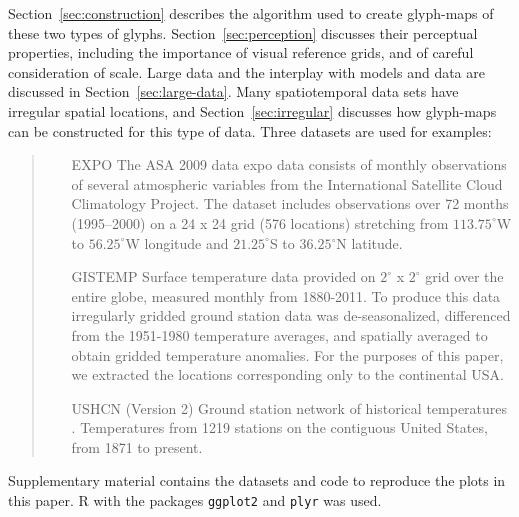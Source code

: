 \documentclass[oneside]{article}
\begin{document}


Section~\ref{sec:construction} describes the algorithm used to create glyph-maps of these two types of glyphs. Section~\ref{sec:perception} discusses their perceptual properties, including the importance of visual reference grids, and of careful consideration of scale. Large data and the interplay with models and data are discussed in Section~\ref{sec:large-data}. Many spatiotemporal data sets have irregular spatial locations, and Section~\ref{sec:irregular} discusses how glyph-maps can be constructed for this type of data. Three datasets are used for examples:

\begin{quote}
\begin{itemize} \itemsep 0in

\item[EXPO] The ASA 2009 data expo data \citep{murrell:2010} consists
  of monthly observations of several atmospheric variables from the
  International Satellite Cloud Climatology Project. The dataset
  includes observations over 72 months (1995--2000) on a 24 x 24 grid
  (576 locations) stretching from $113.75^{\circ}$W to
  $56.25^{\circ}$W longitude and $21.25^{\circ}$S to $36.25{^\circ}$N
  latitude.

\item[GISTEMP] Surface temperature data provided on $2^{\circ}$ x
  $2^{\circ}$ grid over the entire globe, measured monthly
  \citep{GISTEMP} from 1880-2011. To produce this data irregularly
  gridded ground station data was de-seasonalized, differenced from
  the 1951-1980 temperature averages, and spatially averaged to obtain
  gridded temperature anomalies. For the purposes of this paper, we
  extracted the locations corresponding only to the continental USA.

\item[USHCN] (Version 2) Ground station network of historical
  temperatures \citep{USHCN}. Temperatures from 1219 stations on the
  contiguous United States, from 1871 to present.
  
\end{itemize}
\end{quote}
Supplementary material contains the datasets and code to reproduce the plots in this paper.  R \citep{R} with the packages {\tt ggplot2} \citep{me:ggplot2} and {\tt plyr} \citep{me:plyr} was used. 
\end{document}
